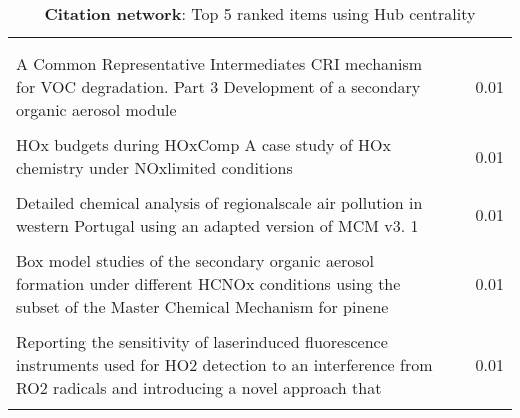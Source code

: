 \begin{table}[H]
     \begin{tabular}{p{}p{}c}
     \toprule
      & & \\\\
     A Common Representative Intermediates CRI mechanism for VOC degradation. Part 3 Development of a secondary organic aerosol module & \cite{Hub0} & 0.01  \\ \\
        HOx budgets during HOxComp A case study of HOx chemistry under NOxlimited conditions & \cite{Hub1} & 0.01  \\ \\
        Detailed chemical analysis of regionalscale air pollution in western Portugal using an adapted version of MCM v3. 1 & \cite{Hub2} & 0.01  \\ \\
        Box model studies of the secondary organic aerosol formation under different HCNOx conditions using the subset of the Master Chemical Mechanism for pinene & \cite{Hub3} & 0.01  \\ \\
        Reporting the sensitivity of laserinduced fluorescence instruments used for HO2 detection to an interference from RO2 radicals and introducing a novel approach that & \cite{Hub4} & 0.01  \\ \\
        \bottomrule
    \end{tabular}
    \label{tab:Hub_Citation}
    \caption{\textbf{Citation network}: Top 5 ranked items using Hub centrality}
    \end{table}

    
